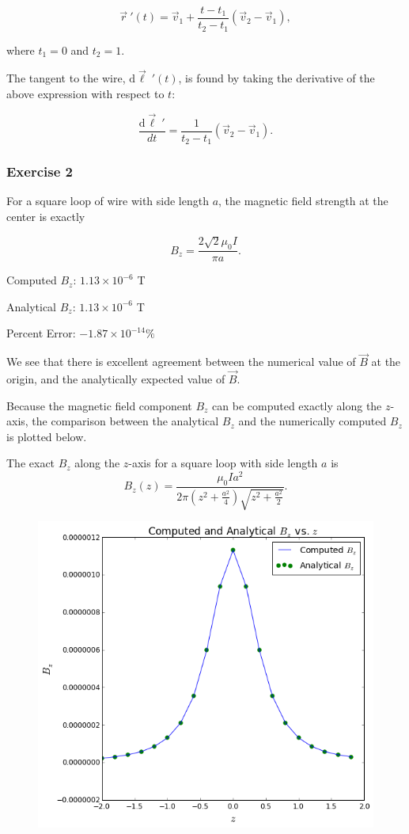\documentclass[]{article}
\begin{document}
\[ \vec{r}\ ' (t) = \vec{v}_1 + \frac{t-t_1}{t_2 - t_1}\left( \vec{v}_2 - \vec{v}_1 \right), \]

where \(t_1=0\) and \(t_2=1\).

The tangent to the wire, \(\mathrm{d}\vec{\ell}\ ' (t)\), is found by
taking the derivative of the above expression with respect to \(t\):

\[ \frac{\mathrm{d}\vec{\ell}\ ' }{dt} = \frac{1}{t_2 - t_1}\left( \vec{v}_2 - \vec{v}_1 \right) .\]

\subsubsection{Exercise 2}\label{exercise-2}

For a square loop of wire with side length \(a\), the magnetic field
strength at the center is exactly

\[ B_z = \frac{2\sqrt{2} \mu_0 I}{\pi a}. \]

Computed \(B_z\): \(1.13\times 10^{-6}\) T

Analytical \(B_z\): \(1.13\times 10^{-6}\) T

Percent Error: \(-1.87\times 10^{-14} \%\)

We see that there is excellent agreement between the numerical value of
\(\vec{B}\) at the origin, and the analytically expected value of
\(\vec{B}\).

Because the magnetic field component \(B_z\) can be computed exactly
along the \(z\)-axis, the comparison between the analytical \(B_z\) and
the numerically computed \(B_z\) is plotted below.

The exact \(B_z\) along the \(z\)-axis for a square loop with side
length \(a\) is
\[ B_z(z) = \frac{\mu_0 I a^2}{2\pi \left( z^2 + \frac{a^2}{4} \right) \sqrt{z^2 + \frac{a^2}{2}}}. \]

\begin{figure}[htbp]
\centering
\includegraphics{images/output_19_2.png}
\caption{}
\end{figure}
\end{document}
